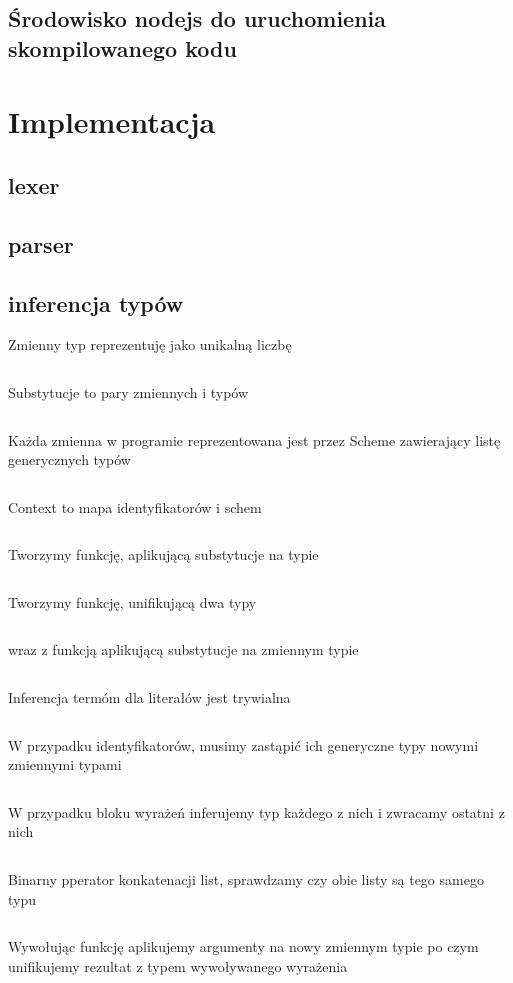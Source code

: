 \documentclass{article}
\begin{document}
\subsection{Środowisko nodejs do uruchomienia skompilowanego kodu}
\section{Implementacja}
\subsection{lexer}
\subsection{parser}
\subsection{inferencja typów}
Zmienny typ reprezentuję jako unikalną liczbę
\inputminted[firstline=28, lastline=34]{python}{algorithm_j.py}
Substytucje to pary zmiennych i typów
\inputminted[firstline=25, lastline=25]{python}{algorithm_j.py}
Każda zmienna w programie reprezentowana jest przez Scheme zawierający listę generycznych typów
\inputminted[firstline=26, lastline=26]{python}{algorithm_j.py}
Context to mapa identyfikatorów i schem
\inputminted[firstline=12, lastline=22]{python}{algorithm_j.py}
Tworzymy funkcję, aplikującą substytucje na typie
\inputminted[firstline=37, lastline=46]{python}{algorithm_j.py}
Tworzymy funkcję, unifikującą dwa typy
\inputminted[firstline=95, lastline=112]{python}{algorithm_j.py}
wraz z funkcją aplikującą substytucje na zmiennym typie
\inputminted[firstline=115, lastline=124]{python}{algorithm_j.py}
Inferencja termóm dla literałów jest trywialna
\inputminted[firstline=164, lastline=171]{python}{algorithm_j.py}
W przypadku identyfikatorów, musimy zastąpić ich generyczne typy nowymi zmiennymi typami
\inputminted[firstline=172, lastline=173]{python}{algorithm_j.py}
W przypadku bloku wyrażeń inferujemy typ każdego z nich i zwracamy ostatni z nich
\inputminted[firstline=185, lastline=192]{python}{algorithm_j.py}
Binarny pperator konkatenacji list, sprawdzamy czy obie listy są tego samego typu
\inputminted[firstline=257, lastline=263]{python}{algorithm_j.py}
Wywołując funkcję aplikujemy argumenty na nowy zmiennym typie po czym unifikujemy rezultat z typem wywoływanego wyrażenia
\inputminted[firstline=323, lastline=335]{python}{algorithm_j.py}
\end{document}
